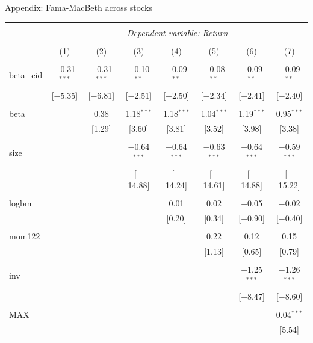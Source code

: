 \documentclass{beamer}
\begin{document}
\scriptsize
{\renewcommand{\arraystretch}{0.72}
\begin{frame}{Appendix: Fama-MacBeth across stocks}
\vspace{-0.3cm}
\begin{table}[!htbp] \centering 
\begin{tabular}{@{\extracolsep{-4pt}}lccccccc} 
\\[-1.8ex]\hline 
\hline \\[-1.8ex] 
 & \multicolumn{7}{c}{\textit{Dependent variable: Return}} \\ 
\cline{2-8} 
\\[-1.8ex] & (1) & (2) & (3) & (4) & (5) & (6) & (7)\\ 
\hline \\[-1.8ex] 
 beta\_cid & $-$0.31$^{***}$ & $-$0.31$^{***}$ & $-$0.10$^{**}$ & $-$0.09$^{**}$ & $-$0.08$^{**}$ & $-$0.09$^{**}$ & $-$0.09$^{**}$ \\ 
  & [$-$5.35] & [$-$6.81] & [$-$2.51] & [$-$2.50] & [$-$2.34] & [$-$2.41] & [$-$2.40] \\ 
  & & & & & & & \\ 
 beta &  & 0.38 & 1.18$^{***}$ & 1.18$^{***}$ & 1.04$^{***}$ & 1.19$^{***}$ & 0.95$^{***}$ \\ 
  &  & [1.29] & [3.60] & [3.81] & [3.52] & [3.98] & [3.38] \\ 
  & & & & & & & \\ 
 size &  &  & $-$0.64$^{***}$ & $-$0.64$^{***}$ & $-$0.63$^{***}$ & $-$0.64$^{***}$ & $-$0.59$^{***}$ \\ 
  &  &  & [$-$14.88] & [$-$14.24] & [$-$14.61] & [$-$14.88] & [$-$15.22] \\ 
  & & & & & & & \\ 
 logbm &  &  &  & 0.01 & 0.02 & $-$0.05 & $-$0.02 \\ 
  &  &  &  & [0.20] & [0.34] & [$-$0.90] & [$-$0.40] \\ 
  & & & & & & & \\ 
 mom122 &  &  &  &  & 0.22 & 0.12 & 0.15 \\ 
  &  &  &  &  & [1.13] & [0.65] & [0.79] \\ 
  & & & & & & & \\ 
 inv &  &  &  &  &  & $-$1.25$^{***}$ & $-$1.26$^{***}$ \\ 
  &  &  &  &  &  & [$-$8.47] & [$-$8.60] \\ 
  & & & & & & & \\ 
 MAX &  &  &  &  &  &  & 0.04$^{***}$ \\ 
  &  &  &  &  &  &  & [5.54] \\ 

\end{tabular}
\end{table}
\end{frame}}
\end{document}
